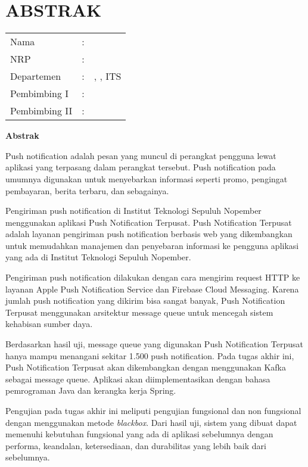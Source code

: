 \chapter {ABSTRAK}


\begin{center}
	\centering\noindent\textbf{\MakeUppercase\judul}
\end{center}
\vspace*{1em}

\begin{tabularx}{\linewidth}{ l l X }
	Nama 			& : & \penulis \\
	NRP 			& :	& \nrp \\
	Departemen 		& : & \jurusan, \newline \fakultas, ITS \\
	Pembimbing I 	& : & \pembimbingsatu \\
	Pembimbing II 	& : & \pembimbingdua
	\vspace*{1em} 	%
\end {tabularx}

\noindent\textbf{Abstrak} \\
\itshape
\par Push notification adalah pesan yang muncul di perangkat pengguna lewat aplikasi yang terpasang dalam perangkat tersebut. Push notification pada umumnya digunakan untuk menyebarkan informasi seperti promo, pengingat pembayaran, berita terbaru, dan sebagainya.
\par Pengiriman push notification di Institut Teknologi Sepuluh Nopember menggunakan aplikasi Push Notification Terpusat. Push Notification Terpusat adalah layanan pengiriman push notification berbasis web yang dikembangkan untuk memudahkan manajemen dan penyebaran informasi ke pengguna aplikasi yang ada di Institut Teknologi Sepuluh Nopember.
\par Pengiriman push notification dilakukan dengan cara mengirim request HTTP ke layanan Apple Push Notification Service dan Firebase Cloud Messaging. Karena jumlah push notification yang dikirim bisa sangat banyak, Push Notification Terpusat menggunakan arsitektur message queue untuk mencegah sistem kehabisan sumber daya.
\par Berdasarkan hasil uji, message queue yang digunakan Push Notification Terpusat hanya mampu menangani sekitar 1.500 push notification. Pada tugas akhir ini, Push Notification Terpusat akan dikembangkan dengan menggunakan Kafka sebagai message queue. Aplikasi akan diimplementasikan dengan bahasa pemrograman Java dan kerangka kerja Spring.
\par Pengujian pada tugas akhir ini meliputi pengujian fungsional dan non fungsional dengan menggunakan metode \textit{blackbox}. Dari hasil uji, sistem yang dibuat dapat memenuhi kebutuhan fungsional yang ada di aplikasi sebelumnya dengan performa, keandalan, ketersediaan, dan durabilitas yang lebih baik dari sebelumnya.

